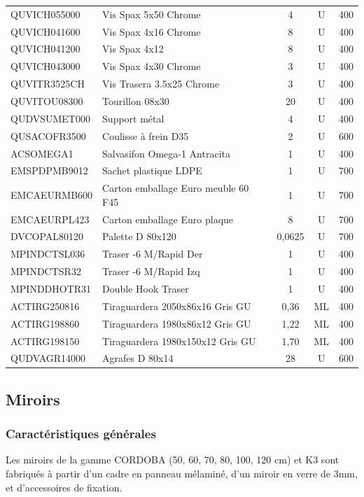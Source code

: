 \documentclass[12pt,a4paper]{article}
\begin{document}
\begin{longtable}{|p{3.5cm}|p{6cm}|c|c|p{2.5cm}|}
QUVICH055000 & Vis Spax 5x50 Chrome & 4 & U & 400 \\
QUVICH041600 & Vis Spax 4x16 Chrome & 8 & U & 400 \\
QUVICH041200 & Vis Spax 4x12 & 8 & U & 400 \\
QUVICH043000 & Vis Spax 4x30 Chrome & 3 & U & 400 \\
QUVITR3525CH & Vis Trasera 3.5x25 Chrome & 3 & U & 400 \\
QUVITOU08300 & Tourillon 08x30 & 20 & U & 400 \\
QUDVSUMET000 & Support métal & 4 & U & 400 \\
QUSACOFR3500 & Coulisse à frein D35 & 2 & U & 600 \\
ACSOMEGA1 & Salvasifon Omega-1 Antracita & 1 & U & 400 \\
EMSPDPMB9012 & Sachet plastique LDPE & 1 & U & 700 \\
EMCAEURMB600 & Carton emballage Euro meuble 60 F45 & 1 & U & 700 \\
EMCAEURPL423 & Carton emballage Euro plaque & 8 & U & 700 \\
DVCOPAL80120 & Palette D 80x120 & 0,0625 & U & 700 \\
MPINDCTSL036 & Traser -6 M/Rapid Der & 1 & U & 400 \\
MPINDCTSR32 & Traser -6 M/Rapid Izq & 1 & U & 400 \\
MPINDDHOTR31 & Double Hook Traser & 1 & U & 400 \\
ACTIRG250816 & Tiraguardera 2050x86x16 Gris GU & 0,36 & ML & 400 \\
ACTIRG198860 & Tiraguardera 1980x86x12 Gris GU & 1,22 & ML & 400 \\
ACTIRG198150 & Tiraguardera 1980x150x12 Gris GU & 1,70 & ML & 400 \\
QUDVAGR14000 & Agrafes D 80x14 & 28 & U & 600 \\
\hline
\end{longtable}

\subsection{Miroirs}

\subsubsection{Caractéristiques générales}
Les miroirs de la gamme CORDOBA (50, 60, 70, 80, 100, 120 cm) et K3 sont fabriqués à partir d'un cadre en panneau mélaminé, d'un miroir en verre de 3mm, et d'accessoires de fixation.
\end{document}

